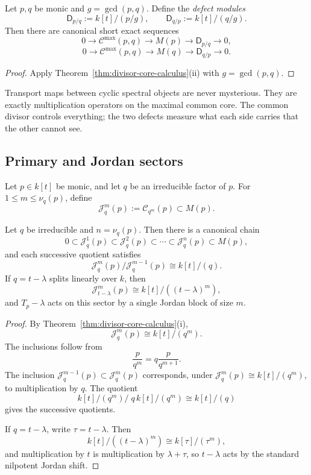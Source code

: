 \begin{corollary}
\label{cor:spectral-defects}
Let \(p,q\) be monic and \(g=\gcd(p,q)\).
Define the \emph{defect modules}
\[
\mathsf D_{p/q}:=k[t]/(p/g),
\qquad
\mathsf D_{q/p}:=k[t]/(q/g).
\]
Then there are canonical short exact sequences
\[
0\longrightarrow \mathcal C^{\max}(p,q)\longrightarrow M(p)\longrightarrow \mathsf D_{p/q}\longrightarrow 0,
\]
\[
0\longrightarrow \mathcal C^{\max}(p,q)\longrightarrow M(q)\longrightarrow \mathsf D_{q/p}\longrightarrow 0.
\]
\end{corollary}

\begin{proof}
Apply Theorem~\ref{thm:divisor-core-calculus}\textup{(ii)} with \(g=\gcd(p,q)\).
\end{proof}

\begin{remark}
Transport maps between cyclic spectral objects are never mysterious.
They are exactly multiplication operators on the maximal common core.
The common divisor controls everything; the two defects measure what each side carries that the other cannot see.
\end{remark}

\subsection{Primary and Jordan sectors}

\begin{definition}
Let \(p\in k[t]\) be monic, and let \(q\) be an irreducible factor of \(p\).
For \(1\le m\le \nu_q(p)\), define
\[
\mathcal J_q^m(p):=\mathcal C_{q^m}(p)\subset M(p).
\]
\end{definition}

\begin{theorem}
\label{thm:primary-jordan-filtration}
Let \(q\) be irreducible and \(n=\nu_q(p)\).
Then there is a canonical chain
\[
0\subset \mathcal J_q^1(p)\subset \mathcal J_q^2(p)\subset \cdots \subset \mathcal J_q^n(p)\subset M(p),
\]
and each successive quotient satisfies
\[
\mathcal J_q^m(p)/\mathcal J_q^{m-1}(p)\cong k[t]/(q).
\]
If \(q=t-\lambda\) splits linearly over \(k\), then
\[
\mathcal J_{t-\lambda}^m(p)\cong k[t]/((t-\lambda)^m),
\]
and \(T_p-\lambda\) acts on this sector by a single Jordan block of size \(m\).
\end{theorem}

\begin{proof}
By Theorem~\ref{thm:divisor-core-calculus}\textup{(i)},
\[
\mathcal J_q^m(p)\cong k[t]/(q^m).
\]
The inclusions follow from
\[
\frac{p}{q^m}=q\frac{p}{q^{m+1}}.
\]
The inclusion \(\mathcal J_q^{m-1}(p)\subset \mathcal J_q^m(p)\) corresponds,
under \(\mathcal J_q^m(p)\cong k[t]/(q^m)\), to multiplication by \(q\).
The quotient
\[
k[t]/(q^m)\Big/\; q\,k[t]/(q^m)\cong k[t]/(q)
\]
gives the successive quotients.

If \(q=t-\lambda\), write \(\tau=t-\lambda\).
Then
\[
k[t]/((t-\lambda)^m)\cong k[\tau]/(\tau^m),
\]
and multiplication by \(t\) is multiplication by \(\lambda+\tau\), so \(t-\lambda\) acts by the standard nilpotent Jordan shift.
\end{proof}


